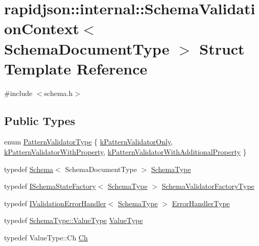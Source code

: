 \hypertarget{structrapidjson_1_1internal_1_1_schema_validation_context}{}\section{rapidjson\+::internal\+::Schema\+Validation\+Context$<$ Schema\+Document\+Type $>$ Struct Template Reference}
\label{structrapidjson_1_1internal_1_1_schema_validation_context}


{\ttfamily \#include $<$schema.\+h$>$}

\subsection*{Public Types}
\begin{DoxyCompactItemize}
\item 
enum \mbox{\hyperlink{structrapidjson_1_1internal_1_1_schema_validation_context_ad47d3576f164e17986132a570f721a46}{Pattern\+Validator\+Type}} \{ \mbox{\hyperlink{structrapidjson_1_1internal_1_1_schema_validation_context_ad47d3576f164e17986132a570f721a46a1a5c44675a684036e353728f8cf61fd3}{k\+Pattern\+Validator\+Only}}, 
\mbox{\hyperlink{structrapidjson_1_1internal_1_1_schema_validation_context_ad47d3576f164e17986132a570f721a46adaf39d34934210fad7ea0771c8876a1b}{k\+Pattern\+Validator\+With\+Property}}, 
\mbox{\hyperlink{structrapidjson_1_1internal_1_1_schema_validation_context_ad47d3576f164e17986132a570f721a46a50fa90fbc765277164e15f6fdc851601}{k\+Pattern\+Validator\+With\+Additional\+Property}}
 \}
\item 
typedef \mbox{\hyperlink{classrapidjson_1_1internal_1_1_schema}{Schema}}$<$ Schema\+Document\+Type $>$ \mbox{\hyperlink{structrapidjson_1_1internal_1_1_schema_validation_context_ae7fc7012fdcdb1b0141b73842c814644}{Schema\+Type}}
\item 
typedef \mbox{\hyperlink{classrapidjson_1_1internal_1_1_i_schema_state_factory}{I\+Schema\+State\+Factory}}$<$ \mbox{\hyperlink{structrapidjson_1_1internal_1_1_schema_validation_context_ae7fc7012fdcdb1b0141b73842c814644}{Schema\+Type}} $>$ \mbox{\hyperlink{structrapidjson_1_1internal_1_1_schema_validation_context_a1065fcde55a4928092fd576743e68e99}{Schema\+Validator\+Factory\+Type}}
\item 
typedef \mbox{\hyperlink{classrapidjson_1_1internal_1_1_i_validation_error_handler}{I\+Validation\+Error\+Handler}}$<$ \mbox{\hyperlink{structrapidjson_1_1internal_1_1_schema_validation_context_ae7fc7012fdcdb1b0141b73842c814644}{Schema\+Type}} $>$ \mbox{\hyperlink{structrapidjson_1_1internal_1_1_schema_validation_context_aca18580c026f47ce432a5a53b71c8d24}{Error\+Handler\+Type}}
\item 
typedef \mbox{\hyperlink{classrapidjson_1_1internal_1_1_schema_a3979a9083c598195927c08c6e3ba91d1}{Schema\+Type\+::\+Value\+Type}} \mbox{\hyperlink{structrapidjson_1_1internal_1_1_schema_validation_context_a8089ea7252f656960c85a840c3f7e311}{Value\+Type}}
\item 
typedef Value\+Type\+::\+Ch \mbox{\hyperlink{structrapidjson_1_1internal_1_1_schema_validation_context_aeb3b15fcfda759e506a5da83c6f782ca}{Ch}}
\end{DoxyCompactItemize}
